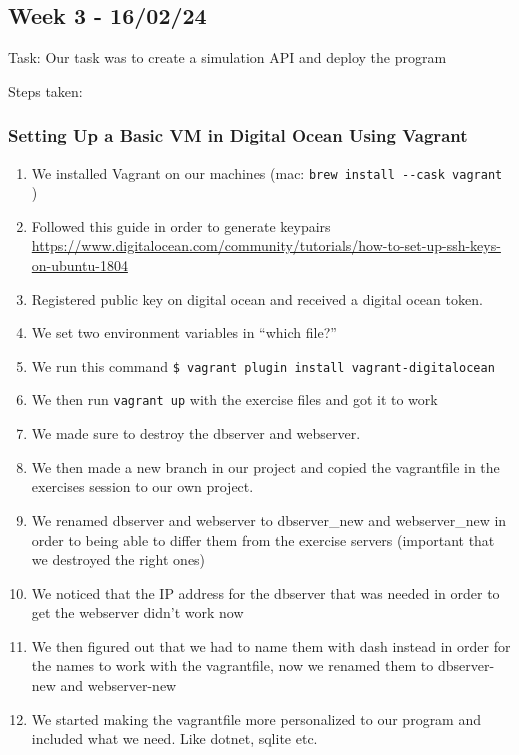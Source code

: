 \subsection{Week 3 - 16/02/24}
\label{log:week3}

Task: Our task was to create a simulation API and deploy the program

Steps taken:

\subsubsection{Setting Up a Basic VM in Digital Ocean Using Vagrant}
\label{log:setting-up-a-basic-vm-in-digital-ocean-using-vagrant}

\begin{enumerate}
    \item We installed Vagrant on our machines (mac: \texttt{brew\ install\ -\/-cask\ vagrant} )
    \item Followed this guide in order to generate keypairs \url{https://www.digitalocean.com/community/tutorials/how-to-set-up-ssh-keys-on-ubuntu-1804}
    \item Registered public key on digital ocean and received a digital ocean token.
    \item We set two environment variables in ``which file?''
    \item We run this command \texttt{\$\ vagrant\ plugin\ install\ vagrant-digitalocean}
    \item We then run \texttt{vagrant\ up} with the exercise files and got it to work
    \item We made sure to destroy the dbserver and webserver.
    \item We then made a new branch in our project and copied the vagrantfile in the exercises session to our own project.
    \item We renamed dbserver and webserver to dbserver\_new and webserver\_new in order to being able to differ them from the exercise servers (important that we destroyed the right ones)
    \item We noticed that the IP address for the dbserver that was needed in order to get the webserver didn't work now
    \item We then figured out that we had to name them with dash instead in order for the names to work with the vagrantfile, now we renamed them to dbserver-new and webserver-new
    \item We started making the vagrantfile more personalized to our program and included what we need. Like dotnet, sqlite etc.
\end{enumerate}

